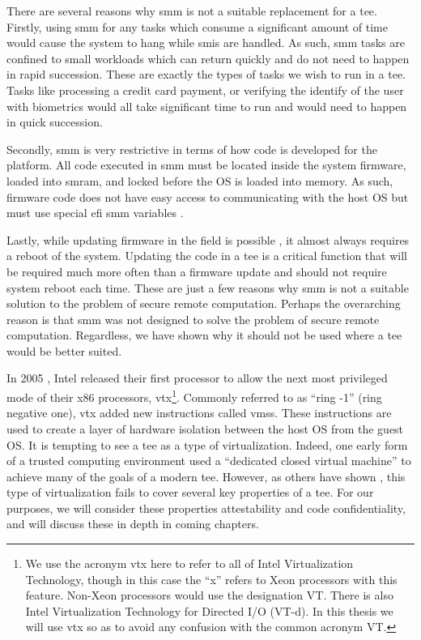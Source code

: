 There are several reasons why \gls{smm} is not a suitable replacement for a \gls{tee}. Firstly, using \gls{smm} for any tasks which consume a significant amount of time would cause the system to hang while \glspl{smi} are handled. As such, \gls{smm} tasks are confined to small workloads which can return quickly and do not need to happen in rapid succession. These are exactly the types of tasks we wish to run in a \gls{tee}. Tasks like processing a credit card payment, or verifying the identify of the user with biometrics would all take significant time to run and would need to happen in quick succession.

Secondly, \gls{smm} is very restrictive in terms of how code is developed for the platform. All code executed in \gls{smm} must be located inside the system firmware, loaded into \gls{smram}, and locked before the OS is loaded into memory. As such, firmware code does not have easy access to communicating with the host OS but must use special \gls{efi} \gls{smm} variables \cite{uefi2020}.

Lastly, while updating firmware in the field is possible \cite{zimmer2011apparatus}, it almost always requires a reboot of the system. Updating the code in a \gls{tee} is a critical function that will be required much more often than a firmware update and should not require system reboot each time. These are just a few reasons why \gls{smm} is not a suitable solution to the problem of secure remote computation. Perhaps the overarching reason is that \gls{smm} was not designed to solve the problem of secure remote computation. Regardless, we have shown why it should not be used where a \gls{tee} would be better suited.

In 2005 \cite{uhlig2005intel}, Intel released their first processor to allow the next most privileged mode of their x86 processors, \gls{vtx}\footnote{We use the acronym \gls{vtx} here to refer to all of Intel Virtualization Technology, though in this case the ``x'' refers to Xeon processors with this feature. Non-Xeon processors would use the designation VT. There is also Intel Virtualization Technology for Directed I/O (VT-d). In this thesis we will use \gls{vtx} so as to avoid any confusion with the common acronym VT.}. Commonly referred to as ``\gls{ring} -1'' (ring negative one), \gls{vtx} added new instructions called \glspl{vms}. These instructions are used to create a layer of hardware isolation between the host OS from the guest OS. It is tempting to see a \gls{tee} as a type of virtualization. Indeed, one early form of a trusted computing environment used a ``dedicated closed virtual machine'' \cite{garfinkel2003terra} to achieve many of the goals of a modern \gls{tee}. However, as others have shown \cite{teeWhatIsIt}, this type of virtualization fails to cover several key properties of a \gls{tee}. For our purposes, we will consider these properties attestability and code confidentiality, and will discuss these in depth in coming chapters.


